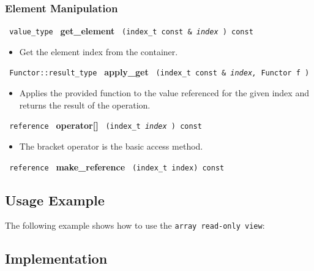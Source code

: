 \subsubsection{ Element Manipulation}

\noindent
\texttt{%
value\_type
}
\newline
\textbf{get\_element}%
\texttt{%
(index\_t const \&
\textit{index}%
) const
}

\begin{itemize}
\item
Get the element index from the container.
\end{itemize}

\noindent
\texttt{%
Functor::result\_type
}
\newline
\textbf{apply\_get}%
\texttt{%
(index\_t const \&
\textit{index,}%
Functor
f
)
}

\begin{itemize}
\item
Applies the provided function to the value referenced for the given index and returns the result of the operation.
\end{itemize}

\noindent
\texttt{%
reference
}
\newline
\textbf{operator[]}%
\texttt{%
(index\_t
\textit{index}%
) const
}

\begin{itemize}
\item
The bracket operator is the basic access method.
\end{itemize}

\noindent
\texttt{%
reference
}
\newline
\textbf{make\_reference}%
\texttt{%
(index\_t index) const
}

\subsection{Usage Example} \label{sec-aryro-vw-use}

The following example shows how to use the \texttt{array read-only view}:


\subsection{Implementation} \label{sec-aryro-vw-impl}

